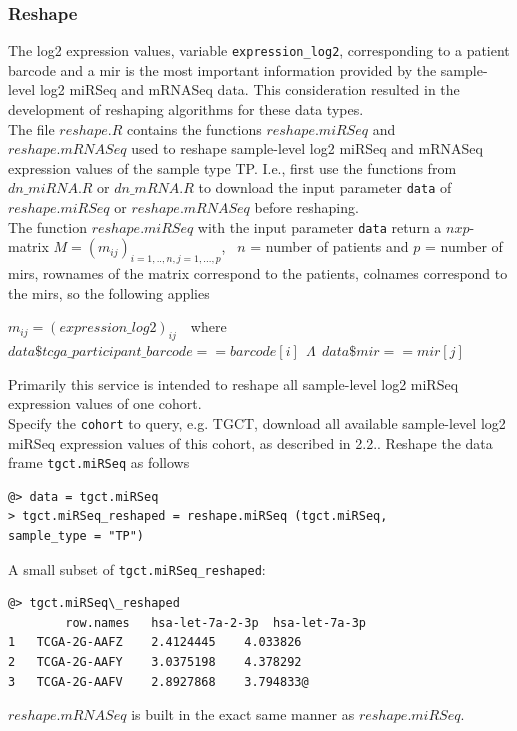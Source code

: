 \documentclass[a4paper,12pt,listof=totoc,bibliography=totoc]{scrartcl}
\begin{document}
\subsubsection{Reshape}
The log2 expression values, variable {\tt expression\_log2}, corresponding to a patient barcode and a mir is the most important information provided by 
the sample-level log2 miRSeq and mRNASeq data. This consideration resulted in the development of reshaping algorithms for these data types. \\
The file $reshape.R$ contains the functions $reshape.miRSeq$ and $reshape.mRNASeq$ used to reshape sample-level log2 miRSeq and mRNASeq 
expression values of the sample type TP. I.e., first use the functions from  $dn\_miRNA.R$ or $dn\_mRNA.R$ to download the input parameter {\tt data}
of $reshape.miRSeq$ or $reshape.mRNASeq$ before reshaping. \\
The function $reshape.miRSeq$ with the input parameter {\tt data} return a $nxp$-matrix $M = (m_{ij})_{i=1,..,n, j=1,...,p}$, \ $n$ = number of patients and 
$p$ = number of mirs, rownames of the matrix correspond to the patients, colnames correspond to the mirs,  so the following applies
\begin{center}
$m_{ij}= (expression\_log2)_{ij}$\ \  where \\
$data\$tcga\_participant\_barcode==barcode[i]\ \  \Lambda\ \ data\$mir==mir[j] $
\end{center}
Primarily this service is intended to reshape all sample-level log2 miRSeq expression values of one cohort. \\
Specify the {\tt cohort} to query, e.g. TGCT, download all available sample-level log2 miRSeq expression values of this cohort, as described 
in 2.2..
Reshape the data frame {\tt tgct.miRSeq} as follows
\begin{lstlisting}[style=base]
@> data = tgct.miRSeq
> tgct.miRSeq_reshaped = reshape.miRSeq (tgct.miRSeq, 
sample_type = "TP")
\end{lstlisting}
A small subset of {\tt tgct.miRSeq\_reshaped}:
\begin{lstlisting}[style=base]
@> tgct.miRSeq\_reshaped
        row.names	hsa-let-7a-2-3p	 hsa-let-7a-3p
1	TCGA-2G-AAFZ	2.4124445	 4.033826
2	TCGA-2G-AAFY	3.0375198	 4.378292
3	TCGA-2G-AAFV	2.8927868	 3.794833@
\end{lstlisting}
$reshape.mRNASeq$ is built in the exact same manner as $reshape.miRSeq$.
\end{document}
